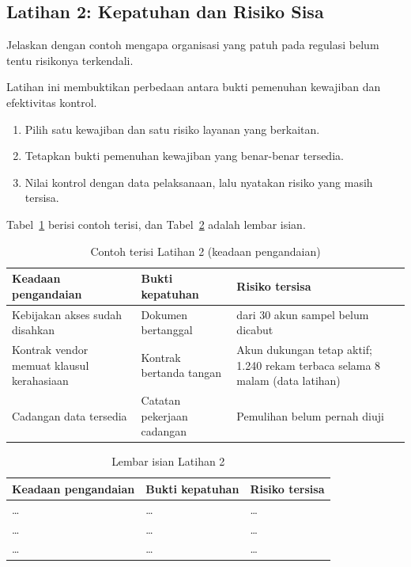 \subsection*{Latihan 2: Kepatuhan dan Risiko Sisa}

Jelaskan dengan contoh mengapa organisasi yang patuh pada regulasi belum tentu risikonya
terkendali.

Latihan ini membuktikan perbedaan antara bukti pemenuhan kewajiban dan efektivitas kontrol.
\begin{enumerate}
  \item Pilih satu kewajiban dan satu risiko layanan yang berkaitan.
  \item Tetapkan bukti pemenuhan kewajiban yang benar-benar tersedia.
  \item Nilai kontrol dengan data pelaksanaan, lalu nyatakan risiko yang masih tersisa.
\end{enumerate}

Tabel~\ref{tab:ch01-lat2-contoh} berisi contoh terisi, dan Tabel~\ref{tab:ch01-lat2-hasil}
adalah lembar isian.
\begin{table}[!htb]
  \centering\small
  \caption{Contoh terisi Latihan 2 (keadaan pengandaian)}\label{tab:ch01-lat2-contoh}
  \begin{tabularx}{\textwidth}{|>{\raggedright\arraybackslash}p{}|>{\raggedright\arraybackslash}X|>{\raggedright\arraybackslash}X|}
    \hline
    \textbf{Keadaan pengandaian} & \textbf{Bukti kepatuhan} & \textbf{Risiko tersisa} \\
    \hline
    Kebijakan akses sudah disahkan & Dokumen bertanggal & 6 dari 30 akun sampel belum
    dicabut \\ \hline
    Kontrak vendor memuat klausul kerahasiaan & Kontrak bertanda tangan & Akun dukungan tetap
    aktif; 1.240 rekam terbaca selama 8 malam (data latihan) \\ \hline
    Cadangan data tersedia & Catatan pekerjaan cadangan & Pemulihan belum pernah diuji \\
    \hline
  \end{tabularx}
\end{table}

\begin{table}[!htb]
  \centering\small
  \caption{Lembar isian Latihan 2}\label{tab:ch01-lat2-hasil}
  \begin{tabularx}{\textwidth}{|>{\raggedright\arraybackslash}p{}|>{\raggedright\arraybackslash}X|>{\raggedright\arraybackslash}X|}
    \hline
    \textbf{Keadaan pengandaian} & \textbf{Bukti kepatuhan} & \textbf{Risiko tersisa} \\
    \hline
    \dots & \dots & \dots \\ \hline
    \dots & \dots & \dots \\ \hline
    \dots & \dots & \dots \\ \hline
  \end{tabularx}
\end{table}

